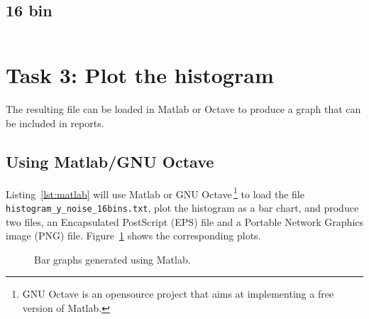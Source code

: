 \documentclass[english,a4paper,12pt,oneside]{article}
\begin{document}
\subsection*{16 bin}
\begin{center}
\begin{tabular}{cc}

\end{tabular}
\end{center}

\section*{Task 3: Plot the histogram}

The resulting file can be loaded in Matlab or Octave to produce a graph that can be included in reports. 

\subsection*{Using Matlab/GNU Octave}


Listing~\ref{lst:matlab} will use Matlab or GNU Octave\,\footnote{GNU Octave is an opensource project that aims at implementing a free version of Matlab.} to load the file \verb+histogram_y_noise_16bins.txt+, plot the histogram as a bar chart,  and produce two files, an Encapsulated PostScript (EPS) file and a Portable Network Graphics image (PNG) file.
Figure~\ref{fig:matlab} shows the corresponding plots. 

\begin{figure}[!h]
\centering
{}\hfill
{}
\caption{\label{fig:matlab}Bar graphs generated using Matlab.}
\end{figure}
\end{document}
